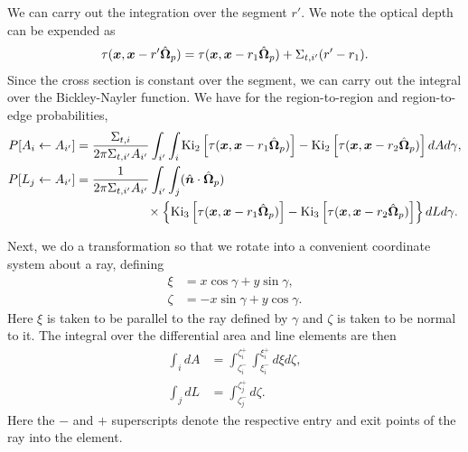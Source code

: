 We can carry out the integration over the segment $r'$. We note the optical depth can be expended as
\begin{align}
  \tau( \bm{x}, \bm{x} - r' \hat{\mathbf{\Omega}}_p ) = \tau( \bm{x}, \bm{x} - r_1 \hat{\mathbf{\Omega}}_p ) + \Sigma_{t,i'} ( r' - r_1 ) . 
\end{align}
Since the cross section is constant over the segment, we can carry out the integral over the Bickley-Nayler function. We have for the region-to-region and region-to-edge probabilities,
\begin{subequations}
\begin{align}
  P[ A_i \leftarrow A_{i'} ] &= \frac{ \Sigma_{t,i} }{ 2\pi \Sigma_{t,i'} A_{i'} } \int_{i'} \int_i \textrm{Ki}_2 \left[ \tau(\bm{x},\bm{x} - r_1 \hat{\mathbf{\Omega}}_p) \right] - \textrm{Ki}_2 \left[ \tau(\bm{x},\bm{x} - r_2 \hat{\mathbf{\Omega}}_p) \right] dA d\gamma , \\
  P[ L_j \leftarrow A_{i'} ] &= \frac{ 1 }{ 2\pi \Sigma_{t,i'} A_{i'} } \int_{i'} \int_j ( \hat{\bm{n}} \cdot \hat{\mathbf{\Omega}}_p ) \nonumber \\*
  &\hspace{2cm} \times \left\{ \textrm{Ki}_3 \left[ \tau(\bm{x},\bm{x} - r_1 \hat{\mathbf{\Omega}}_p) \right] - \textrm{Ki}_3 \left[ \tau(\bm{x},\bm{x} - r_2 \hat{\mathbf{\Omega}}_p) \right] \right\} dL d\gamma .
\end{align}
\end{subequations}

Next, we do a transformation so that we rotate into a convenient coordinate system about a ray, defining
\begin{subequations}
\begin{align}
  \xi 	&=  x \cos\gamma + y \sin\gamma , \\
  \zeta &= -x \sin\gamma + y \cos\gamma .
\end{align}
\end{subequations}
Here $\xi$ is taken to be parallel to the ray defined by $\gamma$ and $\zeta$ is taken to be normal to it. The integral over the differential area and line elements are then
\begin{subequations}
\begin{align}
  \int_i dA &= \int_{\zeta_i^-}^{\zeta_i^+} \int_{\xi_i^-}^{\xi_i^+} d\xi d\zeta, \\
  \int_j dL &= \int_{\zeta_j^-}^{\zeta_j^+} d\zeta .
\end{align}
\end{subequations}
Here the $-$ and $+$ superscripts denote the respective entry and exit points of the ray into the element.


